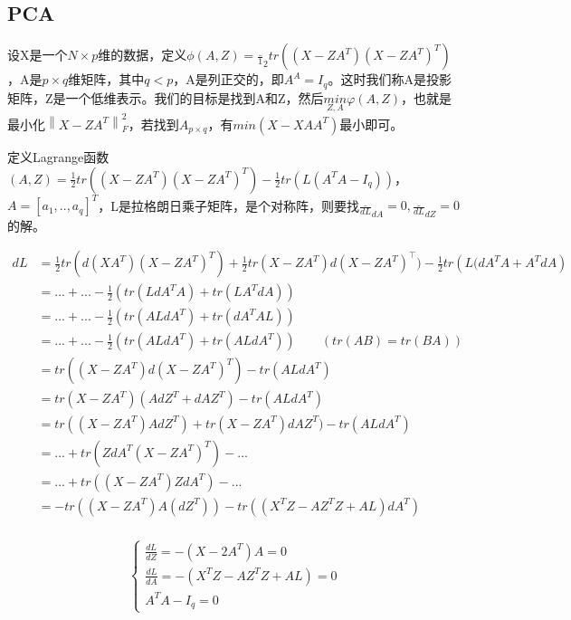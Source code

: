 \documentclass[12pt,UTF8,AutoFakeBold]{article}
\begin{document}
\subsection{PCA}

设X是一个$N\times p$维的数据，定义$\phi(A,Z)=\frac_{1}_{2}tr((X-ZA^T)(X-ZA^T)^T)$，A是$p\times q$维矩阵，其中$q<p$，A是列正交的，即$A^A=I_q$。这时我们称A是投影矩阵，Z是一个低维表示。我们的目标是找到A和Z，然后$\underset {Z,A}{min} \varphi (A,Z)$，也就是最小化${\left\| X-Z{ A }^{ T }\right\|}_{ F }^{ 2 }$，若找到$A_{p\times q}$，有$min(X-XAA^T)$最小即可。

定义Lagrange函数$(A,Z)=\frac { 1 }{ 2 } tr((X-Z{ A }^{ T }){ (X-Z{ A }^{ T }) }^{ T })-\frac { 1 }{ 2 } tr(L({ A }^{ T }A-{ I }_{ q }))$，$A=[a_1,..,a_q]^T$，L是拉格朗日乘子矩阵，是个对称阵，则要找$\frac_{dL}_{dA}=0,\frac_{dL}_{dZ}=0$的解。

\begin{equation}
\begin{aligned}
dL & =\frac { 1 }{ 2 } { tr }\left( d\left( XA^{ T } \right) \left( X-ZA^{ T } \right) ^{ T } \right) +\frac { 1 }{ 2 } { tr }\left( X-ZA^{ T } \right) d\left( X-ZA^{ T } \right) ^{ \top  })-\frac { 1 }{ 2 } { tr }\left( L(dA^{ T }A+A^{ T }dA \right) \\ 
& =...+...-\frac { 1 }{ 2 } (tr(LdA^{ T }A)+tr(LA^{ T }dA))\\
& =...+...-\frac { 1 }{ 2 } (tr(ALdA^{ T })+tr(dA^{ T }AL))\\ 
& =...+...-\frac { 1 }{ 2 } (tr(ALdA^{ T })+tr(ALdA^{ T }))\quad \quad (tr(AB)=tr(BA))\\ 
& ={ tr }\left( (X-ZA^{ T })d{ (X-ZA^{ T }) }^{ T } \right) -tr(ALdA^{ T })\\ 
& ={ tr }\left( X-ZA^{ T } \right) (AdZ^{ T }+dAZ^{ T })-tr(ALdA^{ T })\\ 
& =tr(\left( X-ZA^{ T } \right) AdZ^{ T })+tr(X-ZA^{ T })dAZ^{ T })-tr(ALdA^{ T })\\
& =...+tr(ZdA^{ T }{ \left( X-ZA^{ T } \right)  }^{ T })-...\\ 
& =...+tr(\left( X-ZA^{ T } \right) ZdA^{ T })-...\\ 
& =-tr((X-ZA^{ T })A(dZ^{ T }))-tr((X^{ T }Z-AZ^{ T }Z+AL)dA^{ T })\\
\end{aligned}
\end{equation}

\begin{equation}
\begin{aligned}
\left\{\begin{array}{l}{\frac{d L}{d Z}=-\left(X-2 A^{T}\right) A=0} \\ 
{\frac{d L}{d A}=-\left(X^{T} Z-A Z^{T} Z+A L\right)=0} \\ 
{A^{T} A-I_q=0}\end{array}\right.
\end{aligned}
\end{equation}
\end{document}
